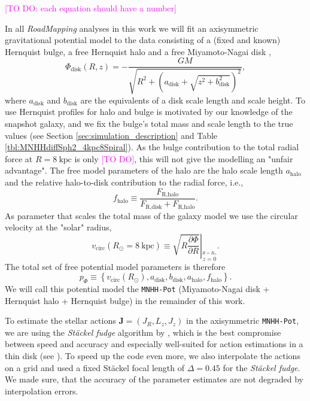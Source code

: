 \documentclass[iop,revtex4,numberedappendix,appendixfloats]{emulateapj}
\newcommand{\vect}[1]{\boldsymbol{#1}}
\newcommand{\RM}{{\sl RoadMapping}}
\newcommand{\Wilma}[1]{\textcolor{Magenta}{#1}}
\begin{document}
\Wilma{[TO DO: each equation should have a number]}

In all \RM{} analyses in this work we will fit an axisymmetric gravitational potential model to the data consisting of a (fixed and known) Hernquist bulge, a free Hernquist halo and a free Miyamoto-Nagai disk \citep{1975PASJ...27..533M},
\begin{equation}
\Phi_\text{disk}(R,z) = - \frac{GM}{\sqrt{R^2+(a_\text{disk}+\sqrt{z^2+b_\text{disk}^2})^2}}, \label{eq:MN-disk}
\end{equation}
where $a_\text{disk}$ and $b_\text{disk}$ are the equivalents of a disk scale length and scale height. To use Hernquist profiles for halo and bulge is motivated by our knowledge of the snapshot galaxy, and we fix the bulge's total mass and scale length to the true values (see Section \ref{sec:simulation_description} and Table \ref{tbl:MNHHdiffSph2_4kpc8Spiral}). As the bulge contribution to the total radial force at $R=8~\text{kpc}$ is only \Wilma{[TO DO]}, this will not give the modelling an "unfair advantage". The free model parameters of the halo are the halo scale length $a_\text{halo}$ and the relative halo-to-disk contribution to the radial force, i.e.,
\begin{equation}
f_\text{halo} \equiv \frac{F_\text{R,halo}}{F_\text{R,disk} + F_\text{R,halo}}.\label{eq:fhalo}
\end{equation}
As parameter that scales the total mass of the galaxy model we use the circular velocity at the "solar" radius,
\begin{equation}
v_\text{circ}(R_\odot=8~\text{kpc}) \equiv \left. \sqrt{ R \frac{\partial \Phi}{\partial R} }\right|_{\stackrel{R=R_\odot}{z=0}} . \label{eq:circvel}
\end{equation}  
The total set of free potential model parameters is therefore
\begin{equation}
p_\Phi \equiv \left\{ v_\text{circ}(R_\odot),a_\text{disk},b_\text{disk},a_\text{halo},f_\text{halo}\right\}.
\end{equation} 
We will call this potential model the \texttt{MNHH-Pot} (Miyamoto-Nagai disk + Hernquist halo + Hernquist bulge) in the remainder of this work.

To estimate the stellar actions $\vect{J}=(J_R,L_z,J_z)$ in the axisymmetric \texttt{MNHH-Pot}, we are using the \emph{St\"{a}ckel fudge} algorithm by \citet{2012MNRAS.426.1324B}, which is the best compromise between speed and accuracy and especially well-suited for action estimations in a thin disk (see \citealt{2016MNRAS.457.2107S}). To speed up the code even more, we also interpolate the actions on a grid \citep{} and used a fixed St\"{a}ckel focal length of $\Delta=0.45$ for the \emph{St\"{a}ckel fudge}. We made sure, that the accuracy of the parameter estimates are not degraded by interpolation errors.
\end{document}
